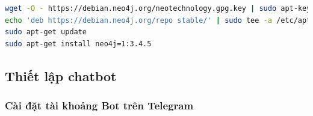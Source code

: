\begin{lstlisting}[language=bash,caption={Cài Neo4j},label={list:installneo4j}]
wget -O - https://debian.neo4j.org/neotechnology.gpg.key | sudo apt-key add -
echo 'deb https://debian.neo4j.org/repo stable/' | sudo tee -a /etc/apt/sources.list.d/neo4j.list
sudo apt-get update
sudo apt-get install neo4j=1:3.4.5
\end{lstlisting}

\subsection{Thiết lập chatbot}
\subsubsection{Cài đặt tài khoảng Bot trên Telegram}












